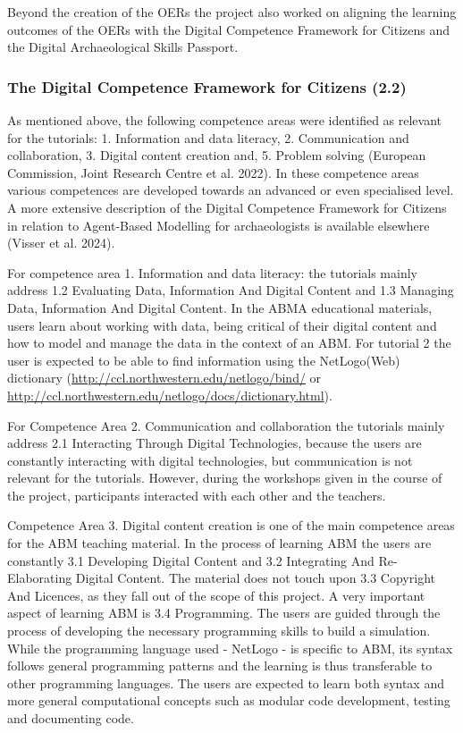 \documentclass[
]{article}
\begin{document}
Beyond the creation of the OERs the project also worked on aligning the learning outcomes of the OERs with the Digital Competence Framework for Citizens and the Digital Archaeological Skills Passport.

\hypertarget{the-digital-competence-framework-for-citizens-2.2}{%
\subsubsection{The Digital Competence Framework for Citizens (2.2)}\label{the-digital-competence-framework-for-citizens-2.2}}

As mentioned above, the following competence areas were identified as relevant for the tutorials: 1. Information and data literacy, 2. Communication and collaboration, 3. Digital content creation and, 5. Problem solving (European Commission, Joint Research Centre et al. 2022). In these competence areas various competences are developed towards an advanced or even specialised level. A more extensive description of the Digital Competence Framework for Citizens in relation to Agent-Based Modelling for archaeologists is available elsewhere (Visser et al. 2024).

For competence area 1. Information and data literacy: the tutorials mainly address 1.2 Evaluating Data, Information And Digital Content and 1.3 Managing Data, Information And Digital Content. In the ABMA educational materials, users learn about working with data, being critical of their digital content and how to model and manage the data in the context of an ABM. For tutorial 2 the user is expected to be able to find information using the NetLogo(Web) dictionary (\url{http://ccl.northwestern.edu/netlogo/bind/} or \url{http://ccl.northwestern.edu/netlogo/docs/dictionary.html}).

For Competence Area 2. Communication and collaboration the tutorials mainly address 2.1 Interacting Through Digital Technologies, because the users are constantly interacting with digital technologies, but communication is not relevant for the tutorials. However, during the workshops given in the course of the project, participants interacted with each other and the teachers.

Competence Area 3. Digital content creation is one of the main competence areas for the ABM teaching material. In the process of learning ABM the users are constantly 3.1 Developing Digital Content and 3.2 Integrating And Re-Elaborating Digital Content. The material does not touch upon 3.3 Copyright And Licences, as they fall out of the scope of this project. A very important aspect of learning ABM is 3.4 Programming. The users are guided through the process of developing the necessary programming skills to build a simulation. While the programming language used - NetLogo - is specific to ABM, its syntax follows general programming patterns and the learning is thus transferable to other programming languages. The users are expected to learn both syntax and more general computational concepts such as modular code development, testing and documenting code.
\end{document}
